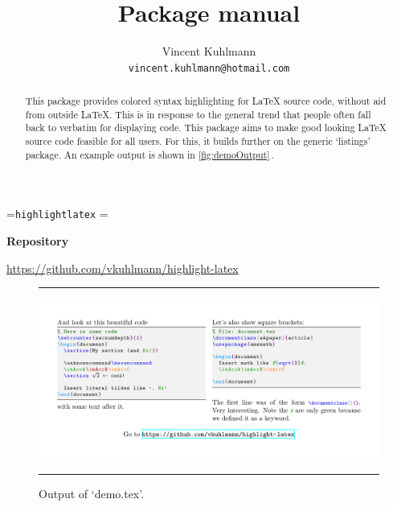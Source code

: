 \documentclass{ltxdoc}
\let\hll\lstinline
\begin{document}
\newbox\cmdintitle
\setbox\cmdintitle=\hbox{\hll|highlightlatex|}%
\setbox\cmdintitle=\hbox{}

\title{Package \usebox\cmdintitle{} manual}
\author{%
	Vincent Kuhlmann\\
	\texttt{vincent.kuhlmann@hotmail.com}
}


\maketitle
\begin{abstract}
	This package provides colored syntax highlighting for \LaTeX{} source code, without aid from
	outside \LaTeX. This is in response to the general trend that people often fall back to verbatim
	for displaying code. This package aims to make good looking \LaTeX{} source code feasible for
	all users. For this, it builds further on the generic `listings' package. An example output is
	shown in \autoref{fig:demoOutput}\,.
\end{abstract}

\bigskip

\begin{center}
	{\small\textbf{Repository}}

	\url{https://github.com/vkuhlmann/highlight-latex}
\end{center}

\vspace{5\baselineskip}

\begin{figure}[htbp]
	\centering
	\rule{2cm}{1pt}

	\bigskip
	\includegraphics[width=\textwidth,trim=1cm 1cm 1cm 1cm, clip]{demo.pdf}
	\caption{Output of `demo.tex'.}\label{fig:demoOutput}
	\bigskip
	\rule{2cm}{1pt}
\end{figure}

\vfil
\end{document}
